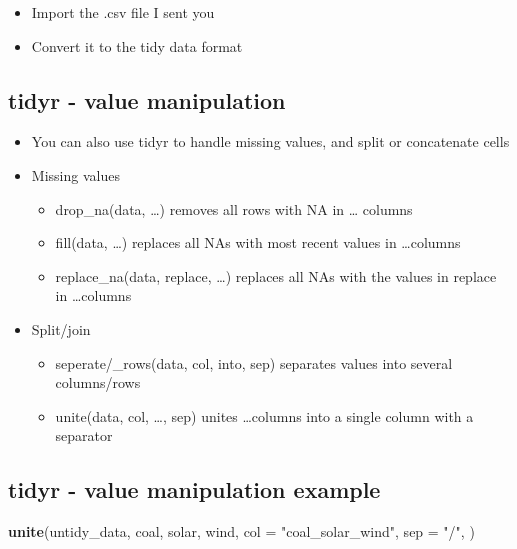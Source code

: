 \documentclass[]{article}
\newenvironment{Shaded}{\begin{snugshade}}{\end{snugshade}}
\newcommand{\KeywordTok}[1]{\textcolor[rgb]{0.13,0.29,0.53}{\textbf{#1}}}
\newcommand{\DataTypeTok}[1]{\textcolor[rgb]{0.13,0.29,0.53}{#1}}
\newcommand{\StringTok}[1]{\textcolor[rgb]{0.31,0.60,0.02}{#1}}
\newcommand{\NormalTok}[1]{#1}
\providecommand{\tightlist}{%
  \setlength{\itemsep}{0pt}\setlength{\parskip}{0pt}}
\begin{document}
\begin{itemize}
\tightlist
\item
  Import the .csv file I sent you
\item
  Convert it to the tidy data format
\end{itemize}

\subsection{tidyr - value
manipulation}\label{tidyr---value-manipulation}

\begin{itemize}
\tightlist
\item
  You can also use tidyr to handle missing values, and split or
  concatenate cells
\item
  Missing values

  \begin{itemize}
  \tightlist
  \item
    drop\_na(data, \ldots{}) removes all rows with NA in \ldots{}
    columns
  \item
    fill(data, \ldots{}) replaces all NAs with most recent values in
    \ldots{}columns
  \item
    replace\_na(data, replace, \ldots{}) replaces all NAs with the
    values in replace in \ldots{}columns
  \end{itemize}
\item
  Split/join

  \begin{itemize}
  \tightlist
  \item
    seperate/\_rows(data, col, into, sep) separates values into several
    columns/rows
  \item
    unite(data, col, \ldots{}, sep) unites \ldots{}columns into a single
    column with a separator
  \end{itemize}
\end{itemize}

\subsection{tidyr - value manipulation
example}\label{tidyr---value-manipulation-example}

\begin{Shaded}
\begin{Highlighting}[]
\KeywordTok{unite}\NormalTok{(untidy_data, coal, solar, wind, }\DataTypeTok{col =} \StringTok{"coal_solar_wind"}\NormalTok{, }\DataTypeTok{sep =} \StringTok{"/"}\NormalTok{,  )}
\end{Highlighting}
\end{Shaded}
\end{document}
